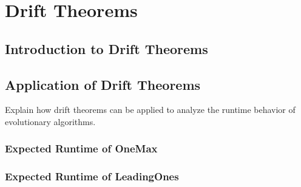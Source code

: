 \section{Drift Theorems}
\subsection{Introduction to Drift Theorems}


\subsection{Application of Drift Theorems}
Explain how drift theorems can be applied to analyze the runtime behavior of evolutionary algorithms.

\subsubsection{Expected Runtime of OneMax}

\subsubsection{Expected Runtime of LeadingOnes}
